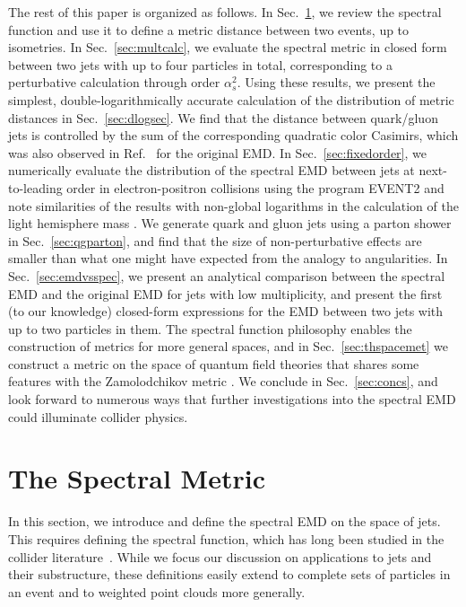 \documentclass[letterpaper,11pt]{article}
\DeclareRobustCommand{\Sec}[1]{Sec.~\ref{#1}}
\DeclareRobustCommand{\InRef}[1]{Ref.~\cite{#1}}
\begin{document}
The rest of this paper is organized as follows.
%
In \Sec{sec:metric}, we review the spectral function and use it to define a metric distance between two events, up to isometries. 
%
In \Sec{sec:multcalc}, we evaluate the spectral metric in closed form between two jets with up to four particles in total, corresponding to a perturbative calculation through order $\alpha_s^2$.  
%
Using these results, we present the simplest, double-logarithmically accurate calculation of the distribution of metric distances in \Sec{sec:dlogsec}.
%
We find that the distance between quark/gluon jets is controlled by the sum of the corresponding quadratic color Casimirs, which was also observed in \InRef{Komiske:2022vxg} for the original EMD.
%
In \Sec{sec:fixedorder}, we numerically evaluate the distribution of the spectral EMD between jets at next-to-leading order in electron-positron collisions using the program EVENT2 \cite{Catani:1996vz} and note similarities of the results with non-global logarithms in the calculation of the light hemisphere mass \cite{Dasgupta:2001sh}.  
%
We generate quark and gluon jets using a parton shower in \Sec{sec:qgparton}, and find that the size of non-perturbative effects are smaller than what one might have expected from the analogy to angularities. 
%
In \Sec{sec:emdvsspec}, we present an analytical comparison between the spectral EMD and the original EMD for jets with low multiplicity, and present the first (to our knowledge) closed-form expressions for the EMD between two jets with up to two particles in them.
%
The spectral function philosophy enables the construction of metrics for more general spaces, and in \Sec{sec:thspacemet} we construct a metric on the space of quantum field theories that shares some features with the Zamolodchikov metric \cite{Zamolodchikov:1986gt,Kutasov:1988xb}.
%
We conclude in \Sec{sec:concs}, and look forward to numerous ways that further investigations into the spectral EMD could illuminate collider physics.


\section{The Spectral Metric}\label{sec:metric}

In this section, we introduce and define the spectral EMD on the space of jets.
%
This requires defining the spectral function, which has long been studied in the collider literature~\cite{Basham:1978bw,Tkachov:1995kk,Jankowiak:2011qa,Chen:2020vvp,Chakraborty:2019imr}.
%
While we focus our discussion on applications to jets and their substructure, these definitions easily extend to complete sets of particles in an event and to weighted point clouds more generally.
\end{document}

